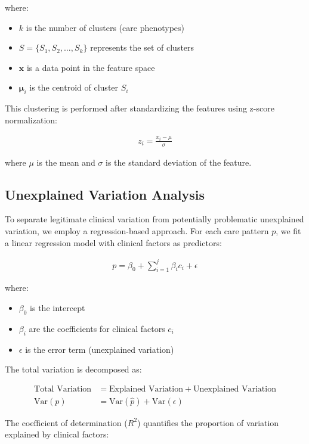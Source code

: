 \documentclass[12pt]{article}
\begin{document}
where:
\begin{itemize}
    \item $k$ is the number of clusters (care phenotypes)
    \item $S = \{S_1, S_2, \ldots, S_k\}$ represents the set of clusters
    \item $\mathbf{x}$ is a data point in the feature space
    \item $\boldsymbol{\mu}_i$ is the centroid of cluster $S_i$
\end{itemize}

This clustering is performed after standardizing the features using z-score normalization:

\begin{align}
z_i = \frac{x_i - \mu}{\sigma}
\end{align}

where $\mu$ is the mean and $\sigma$ is the standard deviation of the feature.

\subsection{Unexplained Variation Analysis}

To separate legitimate clinical variation from potentially problematic unexplained variation, we employ a regression-based approach. For each care pattern $p$, we fit a linear regression model with clinical factors as predictors:

\begin{align}
p = \beta_0 + \sum_{i=1}^{j} \beta_i c_i + \epsilon
\end{align}

where:
\begin{itemize}
    \item $\beta_0$ is the intercept
    \item $\beta_i$ are the coefficients for clinical factors $c_i$
    \item $\epsilon$ is the error term (unexplained variation)
\end{itemize}

The total variation is decomposed as:

\begin{align}
\text{Total Variation} &= \text{Explained Variation} + \text{Unexplained Variation}\\
\text{Var}(p) &= \text{Var}(\hat{p}) + \text{Var}(\epsilon)
\end{align}

The coefficient of determination ($R^2$) quantifies the proportion of variation explained by clinical factors:
\end{document}
